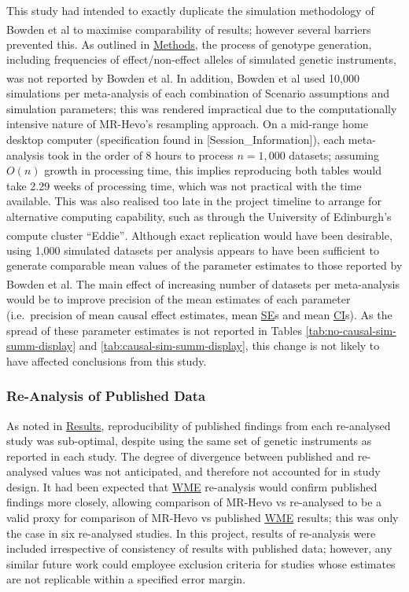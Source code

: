\documentclass[
]{article}
\begin{document}
This study had intended to exactly duplicate the simulation methodology of Bowden et al\textsuperscript{} to maximise comparability of results; however several barriers prevented this. As outlined in \hyperref[Methods]{Methods}, the process of genotype generation, including frequencies of effect/non-effect alleles of simulated genetic instruments, was not reported by Bowden et al\textsuperscript{}. In addition, Bowden et al used 10,000 simulations per meta-analysis of each combination of Scenario assumptions and simulation parameters; this was rendered impractical due to the computationally intensive nature of MR-Hevo's resampling approach. On a mid-range home desktop computer (specification found in {[}Session\_Information{]}), each meta-analysis took in the order of 8 hours to process \(n = 1,000\) datasets; assuming \(O(n)\) growth in processing time, this implies reproducing both tables would take 2.29 weeks of processing time, which was not practical with the time available. This was also realised too late in the project timeline to arrange for alternative computing capability, such as through the University of Edinburgh's compute cluster ``Eddie''\textsuperscript{}. Although exact replication would have been desirable, using 1,000 simulated datasets per analysis appears to have been sufficient to generate comparable mean values of the parameter estimates to those reported by Bowden et al\textsuperscript{}. The main effect of increasing number of datasets per meta-analysis would be to improve precision of the mean estimates of each parameter (i.e.~precision of mean causal effect estimates, mean \hyperref[acronyms_SE]{SE}s and mean \hyperref[acronyms_CI]{CI}s). As the spread of these parameter estimates is not reported in Tables \ref{tab:no-causal-sim-summ-display} and \ref{tab:causal-sim-summ-display}, this change is not likely to have affected conclusions from this study.

\subsubsection{Re-Analysis of Published Data}\label{lim-cite}

As noted in \hyperref[results]{Results}, reproducibility of published findings from each re-analysed study was sub-optimal, despite using the same set of genetic instruments as reported in each study. The degree of divergence between published and re-analysed values was not anticipated, and therefore not accounted for in study design. It had been expected that \hyperref[acronyms_WME]{WME} re-analysis would confirm published findings more closely, allowing comparison of MR-Hevo vs re-analysed to be a valid proxy for comparison of MR-Hevo vs published \hyperref[acronyms_WME]{WME} results; this was only the case in six re-analysed studies. In this project, results of re-analysis were included irrespective of consistency of results with published data; however, any similar future work could employee exclusion criteria for studies whose estimates are not replicable within a specified error margin.
\end{document}
